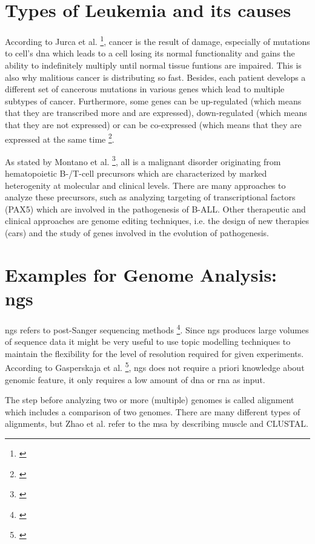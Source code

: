 {{{{\section{Types of Leukemia and its causes}\label{leukemia_types}
According to Jurca et al. \footnote{\autocite{jurca_2016}}, cancer is the result of damage, especially of mutations to cell's \gls{dna} which leads to a cell losing its normal functionality and gains the ability to indefinitely multiply until normal tissue funtions are impaired. This is also why malitious cancer is distributing so fast. Besides, each patient develops a different set of cancerous mutations in various genes which lead to multiple subtypes of cancer.
Furthermore, some genes can be up-regulated (which means that they are transcribed more and are expressed), down-regulated (which means that they are not expressed) or can be co-expressed (which means that they are expressed at the same time \footnote{\autocite{jurca_2016}}.

As stated by Montano et al. \footnote{\autocite{montano_2018}}, \gls{all} is a malignant disorder originating from hematopoietic B-/T-cell precursors which are characterized by marked heterogenity at molecular and clinical levels. There are many approaches to analyze these precursors, such as analyzing targeting of transcriptional factors (PAX5) which are involved in the pathogenesis of B-ALL. Other therapeutic and clinical approaches are genome editing techniques, i.e. the design of new therapies (\gls{car}s) and the study of genes involved in the evolution of pathogenesis.

\section{Examples for Genome Analysis: \gls{ngs}}\label{genome_analysis}
\gls{ngs} refers to post-Sanger sequencing methods \footnote{\autocite{zhao_2016}}. Since \gls{ngs} produces large volumes of sequence data it might be very useful to use topic modelling techniques to maintain the flexibility for the level of resolution required for given experiments.  
According to Gasperskaja et al. \footnote{\autocite{gasperskaja_2017}}, \gls{ngs} does not require a priori knowledge about genomic feature, it only requires a low amount of \gls{dna} or \gls{rna} as input.

The step before analyzing two or more (multiple) genomes is called alignment which includes a comparison of two genomes. There are many different types of alignments, but Zhao et al. refer to the \gls{msa} by describing \gls{muscle} and CLUSTAL.

}}}}
